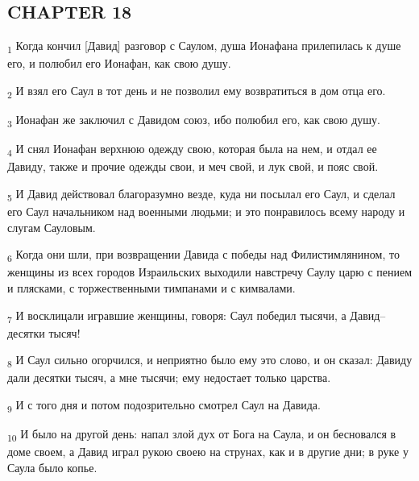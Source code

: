 \subsection{CHAPTER 18}
\begin{tcolorbox}
\textsubscript{1} Когда кончил [Давид] разговор с Саулом, душа Ионафана прилепилась к душе его, и полюбил его Ионафан, как свою душу.
\end{tcolorbox}
\begin{tcolorbox}
\textsubscript{2} И взял его Саул в тот день и не позволил ему возвратиться в дом отца его.
\end{tcolorbox}
\begin{tcolorbox}
\textsubscript{3} Ионафан же заключил с Давидом союз, ибо полюбил его, как свою душу.
\end{tcolorbox}
\begin{tcolorbox}
\textsubscript{4} И снял Ионафан верхнюю одежду свою, которая была на нем, и отдал ее Давиду, также и прочие одежды свои, и меч свой, и лук свой, и пояс свой.
\end{tcolorbox}
\begin{tcolorbox}
\textsubscript{5} И Давид действовал благоразумно везде, куда ни посылал его Саул, и сделал его Саул начальником над военными людьми; и это понравилось всему народу и слугам Сауловым.
\end{tcolorbox}
\begin{tcolorbox}
\textsubscript{6} Когда они шли, при возвращении Давида с победы над Филистимлянином, то женщины из всех городов Израильских выходили навстречу Саулу царю с пением и плясками, с торжественными тимпанами и с кимвалами.
\end{tcolorbox}
\begin{tcolorbox}
\textsubscript{7} И восклицали игравшие женщины, говоря: Саул победил тысячи, а Давид--десятки тысяч!
\end{tcolorbox}
\begin{tcolorbox}
\textsubscript{8} И Саул сильно огорчился, и неприятно было ему это слово, и он сказал: Давиду дали десятки тысяч, а мне тысячи; ему недостает только царства.
\end{tcolorbox}
\begin{tcolorbox}
\textsubscript{9} И с того дня и потом подозрительно смотрел Саул на Давида.
\end{tcolorbox}
\begin{tcolorbox}
\textsubscript{10} И было на другой день: напал злой дух от Бога на Саула, и он бесновался в доме своем, а Давид играл рукою своею на струнах, как и в другие дни; в руке у Саула было копье.
\end{tcolorbox}
